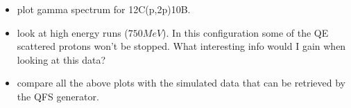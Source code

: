 \documentclass{report}
\begin{document}
\begin{itemize}
\item plot gamma spectrum for 12C(p,2p)10B.
\item look at high energy runs ($750 MeV$). In this configuration some of the QE scattered protons won't be stopped. What interesting info would I gain when looking at this data? 
\item compare all the above plots with the simulated data that can be retrieved by the QFS generator.
\end{itemize}
\end{document}
